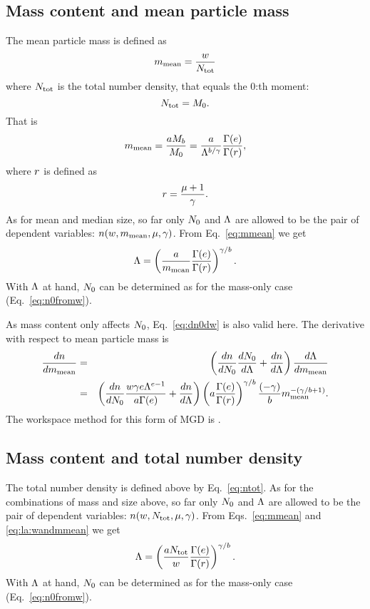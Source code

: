 \subsection{Mass content and mean particle mass}
%
The mean particle mass is defined as
\begin{equation}
  m_\mathrm{mean} = \frac{w}{N_{\mathrm{tot}}}
  \label{eq:mmean}
\end{equation}
where $N_{\mathrm{tot}}$ is the total number density, that equals the 0:th moment:
\begin{equation}
  N_{\mathrm{tot}} = M_0.
  \label{eq:ntot}
\end{equation}
That is
\begin{equation}
  m_\mathrm{mean} = \frac{aM_b}{M_0} = \frac{a}{\Lambda^{b/\gamma}}\frac{\Gamma(e)}{\Gamma(r)},
  \label{eq:mmean}
\end{equation}
where $r$ is defined as
\begin{equation}
  r = \frac{\mu+1}{\gamma}.
  \label{eq:rterm}
\end{equation}
As for mean and median size, so far only $N_0$ and $\Lambda$ are allowed to be the
pair of dependent variables: $n(w,m_\mathrm{mean},\mu,\gamma)$. From
Eq.~\ref{eq:mmean} we get
\begin{equation}
  \Lambda = \left( \frac{a}{m_\mathrm{mean}}
    \frac{\Gamma(e)}{\Gamma(r)}\right)^{\gamma/b}.
  \label{eq:la:wandmmean}
\end{equation}
With $\Lambda$ at hand, $N_0$ can be determined as for the mass-only case
(Eq.~\ref{eq:n0fromw}).

As mass content only affects $N_0$, Eq.~\ref{eq:dn0dw} is also valid here.
The derivative with respect to mean particle mass is 
\begin{eqnarray}
  \frac{dn}{dm_\mathrm{mean}} &=& \left( \frac{dn}{dN_0}\frac{dN_0}{d\Lambda} + 
                        \frac{dn}{d\Lambda} \right) \frac{d\Lambda}{dm_\mathrm{mean}} \nonumber\\
 &=& \left( \frac{dn}{dN_0} \frac{w\gamma e\Lambda^{e-1}}{a\Gamma(e)} + 
                        \frac{dn}{d\Lambda} \right) 
   \left(a\frac{\Gamma(e)}{\Gamma(r)}\right)^{\gamma/b} \frac{(-\gamma)}{b}m_\mathrm{mean}^{-(\gamma/b+1)}.
\end{eqnarray}
The workspace method for this form of MGD is .


\subsection{Mass content and total number density}
%
The total number density is defined above by Eq.~\ref{eq:ntot}. As for the
combinations of mass and size above, so far only $N_0$ and $\Lambda$ are allowed to
be the pair of dependent variables: $n(w,N_{\mathrm{tot}},\mu,\gamma)$. From
Eqs.~\ref{eq:mmean} and \ref{eq:la:wandmmean} we get
\begin{equation}
  \Lambda = \left( \frac{aN_{\mathrm{tot}}}{w}
    \frac{\Gamma(e)}{\Gamma(r)}\right)^{\gamma/b}.
  \label{eq:la:wandntot}
\end{equation}
With $\Lambda$ at hand, $N_0$ can be determined as for the mass-only case
(Eq.~\ref{eq:n0fromw}).

